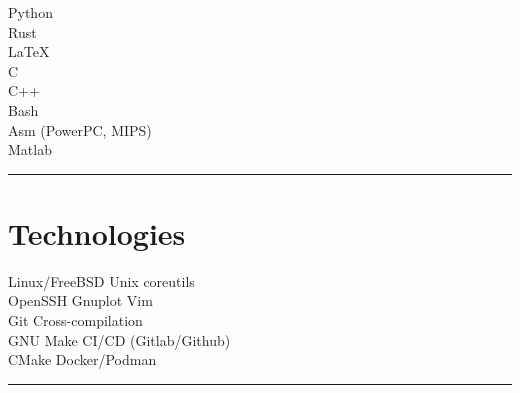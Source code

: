 \documentclass[letterpaper]{deedy-resume}
\begin{document}
\begin{minipage}[t]{0.26\textwidth}
\vspace{1em}

\textbullet{} Python \\
\textbullet{} Rust\\
\textbullet{} \LaTeX \\
\textbullet{} C \\
\textbullet{} C++ \\
\textbullet{} Bash \\
\textbullet{} Asm (PowerPC, MIPS) \\
\textbullet{} Matlab \\

\sectionspace %
\vspace{-1ex}
\rule{5cm}{0.5pt}
\vspace{2em}

\section{Technologies}

\vspace{1em}

Linux/FreeBSD \textbullet{} Unix coreutils\\
OpenSSH \textbullet{} Gnuplot \textbullet{} Vim\\
Git \textbullet{} Cross-compilation\\
GNU Make \textbullet{} CI/CD (Gitlab/Github)\\
CMake \textbullet{} Docker/Podman
\sectionspace
\vspace{-1.5ex}
\rule{5cm}{0.5pt}
\vspace{2em}






\end{minipage}
\end{document}
